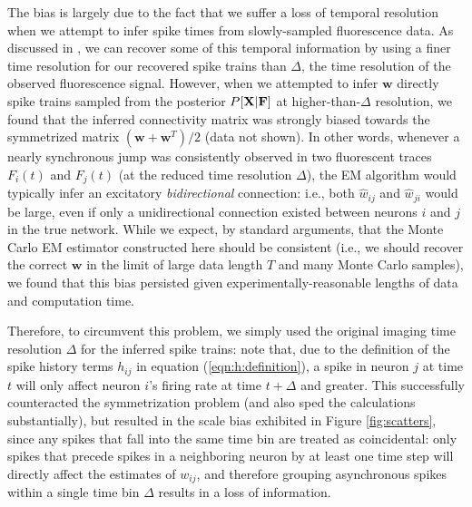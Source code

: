 \documentclass[aoas,preprint]{imsart}
\newcommand{\w}{w}
\newcommand{\bw}{\mathbf{\w}}
\newcommand{\bF}{{\bf F}}
\newcommand{\bX}{{\bf X}}
\begin{document}
The bias is largely due to the fact that we suffer a loss of temporal
resolution when we attempt to infer spike times from slowly-sampled
fluorescence data.  As discussed in \cite{Vogelstein2009}, we can
recover some of this temporal information by using a finer time
resolution for our recovered spike trains than $\Delta$, the time
resolution of the observed fluorescence signal.  However, when we
attempted to infer $\bw$ directly spike trains sampled from the
posterior $P[\bX|\bF]$ at higher-than-$\Delta$ resolution, we found
that the inferred connectivity matrix was strongly biased towards the
symmetrized matrix $(\bw+\bw^T)/2$ (data not shown).  In other words,
whenever a nearly synchronous jump was consistently observed in two
fluorescent traces $F_i(t)$ and $F_j(t)$ (at the reduced time
resolution $\Delta$), the EM algorithm would typically infer an
excitatory \emph{bidirectional} connection: i.e., both $\hat w_{ij}$
and $\hat w_{ji}$ would be large, even if only a unidirectional
connection existed between neurons $i$ and $j$ in the true network.
While we expect, by standard arguments, that the Monte Carlo EM
estimator constructed here should be consistent (i.e., we should
recover the correct $\bw$ in the limit of large data length $T$ and
many Monte Carlo samples), we found that this bias persisted given
experimentally-reasonable lengths of data and computation time.

Therefore, to circumvent this problem, we simply used the original
imaging time resolution $\Delta$ for the inferred spike trains: note
that, due to the definition of the spike history terms $h_{ij}$ in
equation (\ref{eqn:h:definition}), a spike in neuron $j$ at time $t$
will only affect neuron $i$'s firing rate at time $t+\Delta$ and
greater.  This successfully counteracted the symmetrization problem
(and also sped the calculations substantially), but resulted in the
scale bias exhibited in Figure \ref{fig:scatters}, since any spikes
that fall into the same time bin are treated as coincidental: only
spikes that precede spikes in a neighboring neuron by at least one
time step will directly affect the estimates of $w_{ij}$, and
therefore grouping asynchronous spikes within a single time bin
$\Delta$ results in a loss of information.
\end{document}
